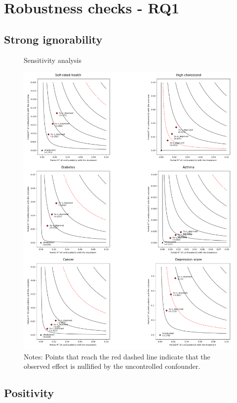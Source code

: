 \section{Robustness checks - RQ1}

\subsection{Strong ignorability}

\begin{figure}
    \centering
    \caption{Sensitivity analysis}
    \label{fig:sense}
    \includegraphics[width=\textwidth]{figures/sensitivity.png}
    \caption*{\footnotesize Notes: Points that reach the red dashed line indicate that the observed effect is nullified by the uncontrolled confounder.}
\end{figure}

\subsection{Positivity}



